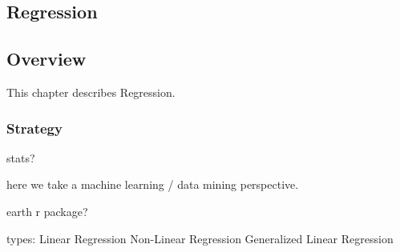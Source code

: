

\renewcommand{\bibsection}{\subsection{\bibname}}
\begin{bibunit}

\chapter{Regression}
\label{ch:regression}

\section{Overview}
This chapter describes Regression.


\subsection{Strategy}

stats?

here we take a machine learning / data mining perspective. 

earth r package?

types:
Linear Regression
Non-Linear Regression
Generalized Linear Regression


\end{bibunit}
